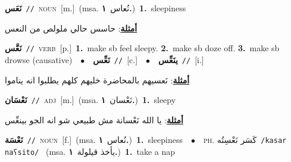 \documentclass[10pt,a4paper,twoside]{article} %
\begin{document}
\begin{multicols}{2}
{\setlength\topsep{0pt}\textbf{\foreignlanguage{arabic}{نَعَس}}\ {\color{gray}\texttt{//}\color{black}}\ \textsc{noun}\ [m.]\ \color{gray}(msa. \foreignlanguage{arabic}{نُعاس}~\foreignlanguage{arabic}{\textbf{١.}})\color{black}\ \textbf{1.}~sleepiness\  \begin{flushright}\color{gray}\foreignlanguage{arabic}{\textbf{\underline{\foreignlanguage{arabic}{أمثلة}}}: حاسس حالي ملولص من النعس}\end{flushright}\color{black}} \vspace{2mm}

{\setlength\topsep{0pt}\textbf{\foreignlanguage{arabic}{نَعَّس}}\ {\color{gray}\texttt{//}\color{black}}\ \textsc{verb}\ [p.]\ \textbf{1.}~make sb feel sleepy.  \textbf{2.}~make sb doze off.  \textbf{3.}~make sb drowse (causative)\ \ $\bullet$\ \ \setlength\topsep{0pt}\textbf{\foreignlanguage{arabic}{نَعِّس}}\ {\color{gray}\texttt{//}\color{black}}\ [c.]\ \ $\bullet$\ \ \setlength\topsep{0pt}\textbf{\foreignlanguage{arabic}{ينَعِّس}}\ {\color{gray}\texttt{//}\color{black}}\ [i.]\  \begin{flushright}\color{gray}\foreignlanguage{arabic}{\textbf{\underline{\foreignlanguage{arabic}{أمثلة}}}: نَعسيهم بالمحاضرة خليهم كلهم يطلبوا انه يناموا}\end{flushright}\color{black}} \vspace{2mm}

{\setlength\topsep{0pt}\textbf{\foreignlanguage{arabic}{نَعْسَان}}\ {\color{gray}\texttt{//}\color{black}}\ \textsc{adj}\ [m.]\ \color{gray}(msa. \foreignlanguage{arabic}{نَعْسان}~\foreignlanguage{arabic}{\textbf{١.}})\color{black}\ \textbf{1.}~sleepy\  \begin{flushright}\color{gray}\foreignlanguage{arabic}{\textbf{\underline{\foreignlanguage{arabic}{أمثلة}}}: يا الله نَعْسانة مش طبيعي شو انه الجو بينعِّس}\end{flushright}\color{black}} \vspace{2mm}

{\setlength\topsep{0pt}\textbf{\foreignlanguage{arabic}{نَعْسَة}}\ {\color{gray}\texttt{//}\color{black}}\ \textsc{noun}\ [f.]\ \color{gray}(msa. \foreignlanguage{arabic}{نُعاس}~\foreignlanguage{arabic}{\textbf{١.}})\color{black}\ \textbf{1.}~sleepiness\ \ $\bullet$\ \ \textsc{ph.} \color{gray} \foreignlanguage{arabic}{كَسَر نَعْسِتُه}\color{black}\ {\color{gray}\texttt{/{\sffamily kasar naʕsito}/}\color{black}}\ \color{gray} (msa. \foreignlanguage{arabic}{يأخذ قيلولة}~\foreignlanguage{arabic}{\textbf{١.}})\color{black}\ \textbf{1.}~take a nap\ } \vspace{2mm}


\end{multicols}
\end{document}
